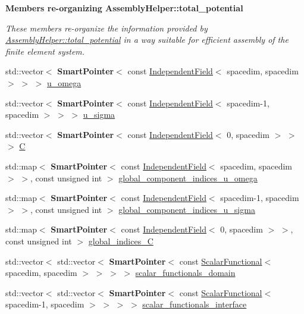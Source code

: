 \begin{Indent}{\bf Members re-\/organizing Assembly\+Helper\+:\+:total\+\_\+potential}\par
{\em These members re-\/organize the information provided by \hyperlink{class_assembly_helper_a748eed9d73b7437a4bf2dcd73108790b}{Assembly\+Helper\+::total\+\_\+potential} in a way suitable for efficient assembly of the finite element system. }\begin{DoxyCompactItemize}
\item 
std\+::vector$<$ {\bf Smart\+Pointer}$<$ const \hyperlink{class_independent_field}{Independent\+Field}$<$ spacedim, spacedim $>$ $>$ $>$ \hyperlink{class_assembly_helper_a1952a054a839a7a683ca108013e7d976}{u\+\_\+omega}
\item 
std\+::vector$<$ {\bf Smart\+Pointer}$<$ const \hyperlink{class_independent_field}{Independent\+Field}$<$ spacedim-\/1, spacedim $>$ $>$ $>$ \hyperlink{class_assembly_helper_a696fe649b3503561235aa1ccbf2ddeef}{u\+\_\+sigma}
\item 
std\+::vector$<$ {\bf Smart\+Pointer}$<$ const \hyperlink{class_independent_field}{Independent\+Field}$<$ 0, spacedim $>$ $>$ $>$ \hyperlink{class_assembly_helper_aa5234a46be82cfe7d92678169d38f326}{C}
\item 
std\+::map$<$ {\bf Smart\+Pointer}$<$ const \hyperlink{class_independent_field}{Independent\+Field}$<$ spacedim, spacedim $>$ $>$, const unsigned int $>$ \hyperlink{class_assembly_helper_a6dae4b6ae7934eaec1ad7baff258ce6e}{global\+\_\+component\+\_\+indices\+\_\+u\+\_\+omega}
\item 
std\+::map$<$ {\bf Smart\+Pointer}$<$ const \hyperlink{class_independent_field}{Independent\+Field}$<$ spacedim-\/1, spacedim $>$ $>$, const unsigned int $>$ \hyperlink{class_assembly_helper_a992a53a1fcac8a393ca53fb8d504bdfe}{global\+\_\+component\+\_\+indices\+\_\+u\+\_\+sigma}
\item 
std\+::map$<$ {\bf Smart\+Pointer}$<$ const \hyperlink{class_independent_field}{Independent\+Field}$<$ 0, spacedim $>$ $>$, const unsigned int $>$ \hyperlink{class_assembly_helper_a9a8f0e8ea8c67ce9429c16a2017cafdc}{global\+\_\+indices\+\_\+C}
\item 
std\+::vector$<$ std\+::vector$<$ {\bf Smart\+Pointer}$<$ const \hyperlink{class_scalar_functional}{Scalar\+Functional}$<$ spacedim, spacedim $>$ $>$ $>$ $>$ \hyperlink{class_assembly_helper_aa6fa619e4c2582e95950e878cd06628e}{scalar\+\_\+functionals\+\_\+domain}
\item 
std\+::vector$<$ std\+::vector$<$ {\bf Smart\+Pointer}$<$ const \hyperlink{class_scalar_functional}{Scalar\+Functional}$<$ spacedim-\/1, spacedim $>$ $>$ $>$ $>$ \hyperlink{class_assembly_helper_a29aa77e0e8e6b35c94966ea88840e462}{scalar\+\_\+functionals\+\_\+interface}

\end{DoxyCompactItemize}
\end{Indent}
